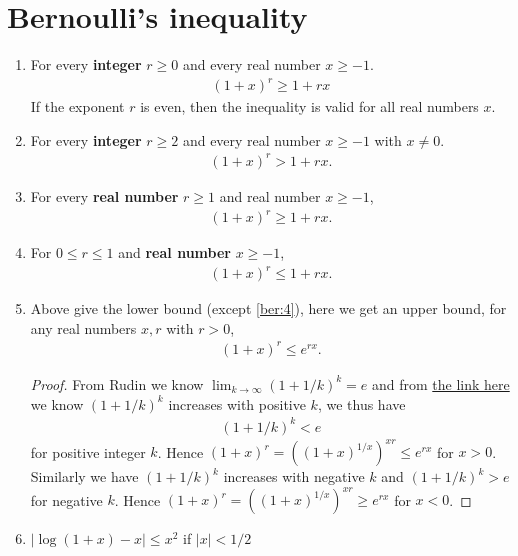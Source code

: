 \documentclass{article}
\begin{document}
\section{Bernoulli's inequality}
\begin{enumerate}
    \item For every \textbf{integer} $r\ge 0$ and every real number $x\ge -1$. \begin{align}
        (1+x)^{r} \geq 1+r x \label{ber:1}
    \end{align}
    If the exponent $r$ is even, then the inequality is valid for all real numbers $x$.
    \item For every \textbf{integer} $r \geq 2$ and every real number $x \geq-1$ with $x \neq 0$. \begin{align}
        (1+x)^{r}>1+r x. \label{ber:2}
    \end{align}
    \item For every \textbf{real number} $r \geq 1$ and real number $x \geq-1$, \begin{align}
        (1+x)^{r} \geq 1+r x. \label{ber:3}
    \end{align}
    \item For $0 \leq r \leq 1$ and \textbf{real number} $x \geq-1$, \begin{align}
        (1+x)^{r} \leq 1+r x. \label{ber:4}
    \end{align}
    \item Above give the lower bound (except \cref{ber:4}), here we get an upper bound,  for any real numbers $x, r$ with $r> 0$, \begin{align}
        (1+x)^{r}\leq e^{rx}.\label{ber:5}
    \end{align}
    \begin{proof}
    From Rudin\cite{rudin1976principles} we know $\lim_{k\to\infty}(1+1/k)^k=e$ and from \href{https://math.stackexchange.com/questions/167843/show-that-left1-dfrac1n-rightn-is-monotonically-increasing}{the link here} we know $(1+1/k)^k$ increases with positive $k$, we thus have
    \begin{align}
        (1+1/k)^k<e \label{ber:5a}
    \end{align} for positive integer $k$. Hence $(1+x)^{r}=\left((1+x)^{1/x}\right)^{xr}\le e^{rx}$ for $x>0$. Similarly we have $(1+1/k)^k$ increases with negative $k$ and $(1+1/k)^k>e$ for negative $k$. Hence $(1+x)^{r}=\left((1+x)^{1/x}\right)^{xr}\ge e^{rx}$ for $x<0$.
    \end{proof}
    \item $\left|\log (1+x)-x \right|\le x^2$ if  $|x|< 1/2$
\end{enumerate}
\end{document}
